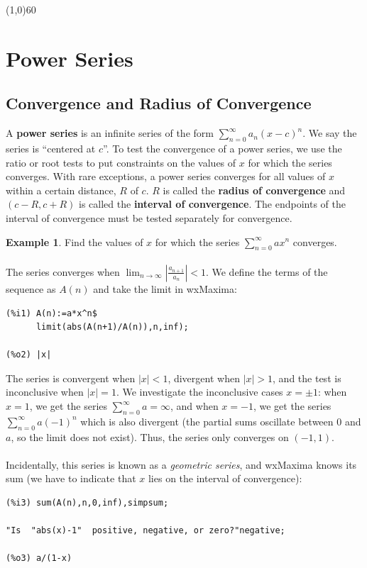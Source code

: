 \documentclass[10.5pt,twoside]{report}
\theoremstyle{definition}
\newtheorem{exmp}{Example}[section]
\begin{document}
\line(1,0){60}
\linethickness{0.5mm}
\pagebreak


\section{Power Series}\label{Power Series}


\subsection{Convergence and Radius of Convergence}

A \textbf{power series} is an infinite series of the form $ \sum_{n=0}^{\infty} a_n (x-c)^n$.  We say the series is ``centered at $c$''.  To test the convergence of a power series, we use the ratio or root tests to put constraints on the values of $x$ for which the series converges.  With rare exceptions, a power series converges for all values of $x$ within a certain distance, $R$ of $c$.  $R$ is called the \textbf{radius of convergence} and $(c-R,c+R)$ is called the \textbf{interval of convergence}.  The endpoints of the interval of convergence must be tested separately for convergence.

\begin{exmp} Find the values of $x$ for which the series $ \sum_{n=0}^{\infty} a x^n$ converges.\\
${}$\\

The series converges when $ \lim_{n\to \infty} \left| \frac{a_{n+1}}{a_n} \right|<1$.  We define the terms of the sequence as $A(n)$ and take the limit in wxMaxima:

\begin{verbatim}
(%i1) A(n):=a*x^n$
      limit(abs(A(n+1)/A(n)),n,inf);
      
(%o2) |x|
\end{verbatim}

The series is convergent when $|x|<1$, divergent when $|x|>1$, and the test is inconclusive when $|x|=1$.  We investigate the inconclusive cases $x=\pm 1$:  when $x=1$, we get the series $ \sum_{n=0}^{\infty} a = \infty$, and when $x=-1$, we get the series $ \sum_{n=0}^{\infty} a (-1)^n$ which is also divergent (the partial sums oscillate between 0 and $a$, so the limit does not exist).  Thus, the series only converges on $(-1,1)$.\\

${}$\\

Incidentally, this series is known as a \textit{geometric series}, and wxMaxima knows its sum (we have to indicate that $x$ lies on the interval of convergence):

\begin{verbatim}
(%i3) sum(A(n),n,0,inf),simpsum;

"Is  "abs(x)-1"  positive, negative, or zero?"negative;

(%o3) a/(1-x)
\end{verbatim}

\end{exmp}
\end{document}
